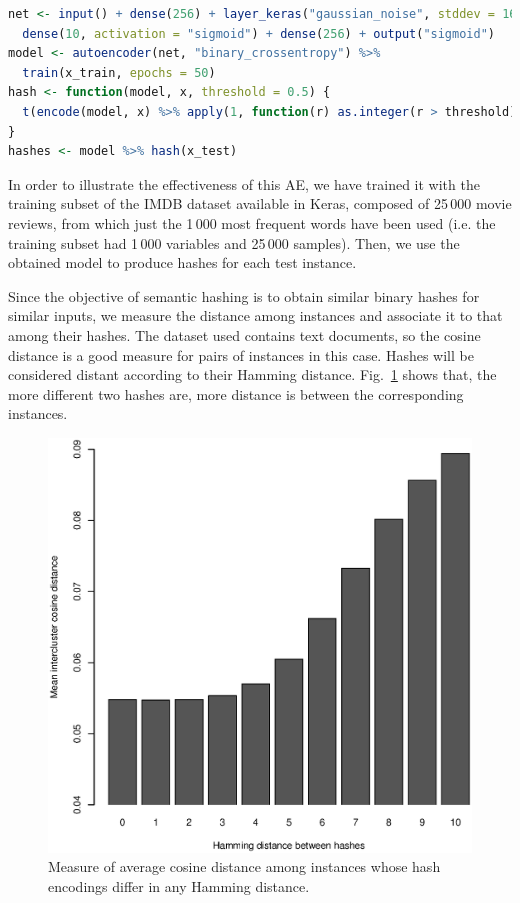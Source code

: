 \begin{lstlisting}[language=R]
net <- input() + dense(256) + layer_keras("gaussian_noise", stddev = 16) +
  dense(10, activation = "sigmoid") + dense(256) + output("sigmoid")
model <- autoencoder(net, "binary_crossentropy") %>% 
  train(x_train, epochs = 50)
hash <- function(model, x, threshold = 0.5) {
  t(encode(model, x) %>% apply(1, function(r) as.integer(r > threshold)))
}
hashes <- model %>% hash(x_test)
\end{lstlisting}

In order to illustrate the effectiveness of this AE, we have trained it with the training subset of the IMDB dataset available in Keras, composed of 25\,000 movie reviews, from which just the 1\,000 most frequent words have been used (i.e. the training subset had 1\,000 variables and 25\,000 samples). Then, we use the obtained model to produce hashes for each test instance. 

Since the objective of semantic hashing is to obtain similar binary hashes for similar inputs, we measure the distance among instances and associate it to that among their hashes. The dataset used contains text documents, so the cosine distance is a good measure for pairs of instances in this case. Hashes will be considered distant according to their Hamming distance. Fig.~\ref{p4fig:hashing} shows that, the more different two hashes are, more distance is between the corresponding instances. %

\begin{figure}[ht]
    \centering
    \includegraphics[width=.75\textwidth]{hashing_intercluster.eps}
    \caption{Measure of average cosine distance among instances whose hash encodings differ in any Hamming distance.}
    \label{p4fig:hashing}
\end{figure}

